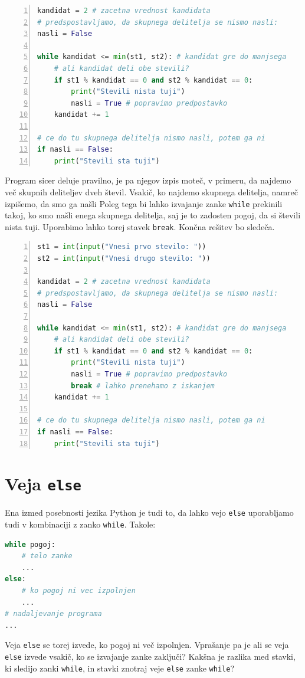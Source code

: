 \begin{resitev}
\begin{lstlisting}[language=Python,numbers=left]
kandidat = 2 # zacetna vrednost kandidata
# predspostavljamo, da skupnega delitelja se nismo nasli:
nasli = False 

while kandidat <= min(st1, st2): # kandidat gre do manjsega
    # ali kandidat deli obe stevili?
    if st1 % kandidat == 0 and st2 % kandidat == 0:
        print("Stevili nista tuji")
        nasli = True # popravimo predpostavko
    kandidat += 1

# ce do tu skupnega delitelja nismo nasli, potem ga ni        
if nasli == False: 
    print("Stevili sta tuji")
\end{lstlisting}
Program sicer deluje pravilno, je pa njegov izpis moteč, v primeru, da najdemo več skupnih deliteljev dveh števil. Vsakič, ko najdemo skupnega delitelja, namreč izpišemo, da smo ga našli
Poleg tega bi lahko izvajanje zanke \texttt{while} prekinili takoj, ko smo našli enega skupnega delitelja, saj je to zadosten pogoj, da si števili nista tuji. Uporabimo lahko torej stavek \texttt{break}. Končna rešitev bo sledeča.
\begin{lstlisting}[language=Python,numbers=left]
st1 = int(input("Vnesi prvo stevilo: "))
st2 = int(input("Vnesi drugo stevilo: "))

kandidat = 2 # zacetna vrednost kandidata
# predspostavljamo, da skupnega delitelja se nismo nasli:
nasli = False 

while kandidat <= min(st1, st2): # kandidat gre do manjsega
    # ali kandidat deli obe stevili?
    if st1 % kandidat == 0 and st2 % kandidat == 0:
        print("Stevili nista tuji")
        nasli = True # popravimo predpostavko
        break # lahko prenehamo z iskanjem
    kandidat += 1 

# ce do tu skupnega delitelja nismo nasli, potem ga ni        
if nasli == False: 
    print("Stevili sta tuji")
\end{lstlisting}
\end{resitev}

\section{Veja \texttt{else}}
Ena izmed posebnosti jezika Python je tudi to, da lahko vejo \texttt{else} uporabljamo tudi v kombinaciji z zanko \texttt{while}. Takole:
\begin{lstlisting}[language=Python]
while pogoj:
    # telo zanke
    ...
else:
    # ko pogoj ni vec izpolnjen
    ...
# nadaljevanje programa
...
\end{lstlisting}
Veja \texttt{else} se torej izvede, ko pogoj ni več izpolnjen. Vprašanje pa je ali se veja \texttt{else} izvede vsakič, ko se izvajanje zanke zaključi? Kakšna je razlika med stavki, ki sledijo zanki \texttt{while}, in stavki znotraj veje \texttt{else} zanke \texttt{while}? 

